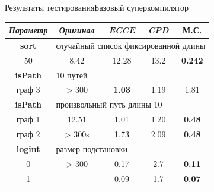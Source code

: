 \documentclass[xcolor=table]{beamer}
\begin{document}
%
\begin{frame}{Результаты тестирования}{\small Базовый суперкомпилятор}
\begin{table}
\center
\begin{tabular}{|c|c|c|c|c|}
\hline
{\it Параметр} & {\it Оригинал} & {\it ECCE }  & {\it CPD} & {\bf М.С.} \\ \hline
\rowcolor{black!10}
{\bf sort} & \multicolumn{4}{|l|}{случайный список фиксированной длины } \\ \hline
50       & 8.42     & 12.28 & 13.2 & {\bf 0.242} \\ \hline

\rowcolor{black!10}
 {\bf isPath} & \multicolumn{4}{|l|}{10 путей} \\ \hline
  граф 3      & > 300 & {\bf 1.03} & 1.19 & 1.81 \\ \hline
 {\bf isPath} & \multicolumn{4}{|l|}{произвольный путь длины 10} \\ \hline
 граф 1  &  12.51  & 1.01 & 1.20 &  {\bf 0.48} \\
 граф 2  &  > 300s & 1.73 & 2.09 & {\bf 0.48} \\ 
 \hline

\rowcolor{black!10}
{\bf logint} & \multicolumn{4}{|l|}{размер подстановки} \\ \hline
0 & > 300    & 0.17  & 2.7  & {\bf 0.11} \\
1 &          & 0.09  & 1.7  & {\bf 0.07} \\
\hline


\end{tabular}
\end{table}
\end{frame}
\end{document}
